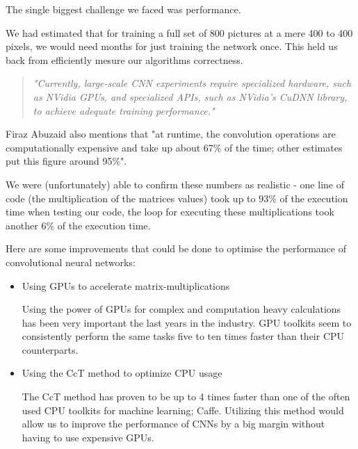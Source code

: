 The single biggest challenge we faced was performance.

We had estimated that for training a full set of 800 pictures at a mere 400 to 400 pixels, we would need months for just training the network once. This held us back from efficiently mesure our algorithms correctness.

\begin{quote}
	\emph{"Currently, large-scale CNN experiments require specialized hardware, such as NVidia GPUs,
		and specialized APIs, such as NVidia’s CuDNN library, to
		achieve  adequate  training  performance."} \cite{Abuzaid2015} 
\end{quote}

Firaz Abuzaid also mentions that "at runtime,  the convolution operations are computationally expensive and take up about 67\% of the time; other estimates put this figure around 95\%".

We were (unfortunately) able to confirm these numbers as realistic - one line of code (the multiplication of the matrices values) took up to 93\% of the execution time when testing our code, the loop for executing these multiplications took another 6\% of the execution time. 

Here are some improvements that could be done to optimise the performance of convolutional neural networks:

\begin{itemize}
	\item Using GPUs to accelerate matrix-multiplications\cite{Hochberg2012}
	
	Using the power of GPUs for complex and computation heavy calculations has been very important the last years in the industry. GPU toolkits seem to consistently perform the same tasks five to ten times faster than their CPU counterparts.\cite{Abuzaid2015}
	
	\item Using the CcT method to optimize CPU usage
	
	The CcT method has proven to be up to 4 times faster than one of the often used CPU toolkits for machine learning; Caffe. Utilizing this method would allow us to improve the performance of CNNs by a big margin without having to use expensive GPUs.\cite{Abuzaid2015}
\end{itemize}